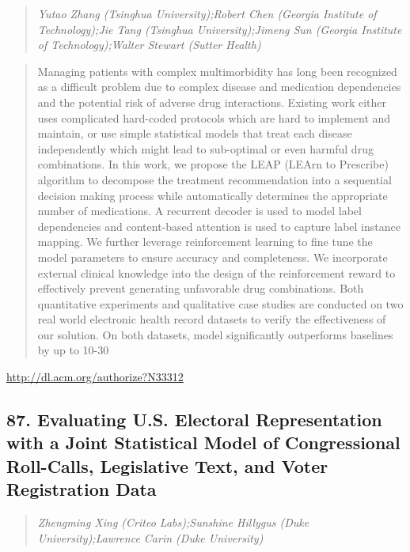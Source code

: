 \documentclass{article}
\begin{document}
\begin{quote}
\footnotesize{\textit{Yutao Zhang (Tsinghua University);Robert Chen (Georgia Institute of Technology);Jie Tang (Tsinghua University);Jimeng Sun (Georgia Institute of Technology);Walter Stewart (Sutter Health)}}

\end{quote}

\begin{quote}
Managing patients with complex multimorbidity has long been recognized as a difficult problem due to complex disease and medication dependencies and the potential risk of adverse drug interactions. Existing work either uses complicated hard-coded protocols which are hard to implement and maintain, or use simple statistical models that treat each disease independently which might lead to sub-optimal or even harmful drug combinations. In this work, we propose the LEAP (LEArn to Prescribe) algorithm to decompose the treatment recommendation into a sequential decision making process while automatically determines the appropriate number of medications. A recurrent decoder is used to model label dependencies and content-based attention is used to capture label instance mapping. We further leverage reinforcement learning to fine tune the model parameters to ensure accuracy and completeness. We incorporate external clinical knowledge into the design of the reinforcement reward to effectively prevent generating unfavorable drug combinations. Both quantitative experiments and qualitative case studies are conducted on two real world electronic health record datasets to verify the effectiveness of our solution. On both datasets, model significantly outperforms baselines by up to 10-30%
\end{quote}

\href{http://dl.acm.org/authorize?N33312}{http://dl.acm.org/authorize?N33312}

\subsection{87. Evaluating U.S. Electoral Representation with a Joint Statistical Model of Congressional Roll-Calls, Legislative Text, and Voter Registration Data}

\begin{quote}
\footnotesize{\textit{Zhengming Xing (Criteo Labs);Sunshine Hillygus (Duke University);Lawrence Carin (Duke University)}}

\end{quote}
\end{document}
